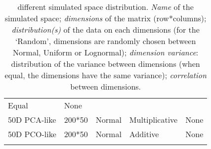 \documentclass[]{article}
\begin{document}
\begin{longtable}[]{@{}lllll@{}}
\begin{minipage}[t]{0.21\columnwidth}
Equal\strut
\end{minipage} & \begin{minipage}[t]{0.13\columnwidth}\raggedright\strut
None\strut
\end{minipage}\tabularnewline
\begin{minipage}[t]{0.12\columnwidth}\raggedright\strut
50D PCA-like\strut
\end{minipage} & \begin{minipage}[t]{0.08\columnwidth}\raggedright\strut
200*50\strut
\end{minipage} & \begin{minipage}[t]{0.31\columnwidth}\raggedright\strut
Normal\strut
\end{minipage} & \begin{minipage}[t]{0.21\columnwidth}\raggedright\strut
Multiplicative\strut
\end{minipage} & \begin{minipage}[t]{0.13\columnwidth}\raggedright\strut
None\strut
\end{minipage}\tabularnewline
\begin{minipage}[t]{0.12\columnwidth}\raggedright\strut
50D PCO-like\strut
\end{minipage} & \begin{minipage}[t]{0.08\columnwidth}\raggedright\strut
200*50\strut
\end{minipage} & \begin{minipage}[t]{0.31\columnwidth}\raggedright\strut
Normal\strut
\end{minipage} & \begin{minipage}[t]{0.21\columnwidth}\raggedright\strut
Additive\strut
\end{minipage} & \begin{minipage}[t]{0.13\columnwidth}\raggedright\strut
None\strut
\end{minipage}\tabularnewline
\bottomrule
\caption{different simulated space distribution. \emph{Name} of the
simulated space; \emph{dimensions} of the matrix (row*columns);
\emph{distribution(s)} of the data on each dimensions (for the `Random',
dimensions are randomly chosen between Normal, Uniform or Lognormal);
\emph{dimension variance}: distribution of the variance between
dimensions (when equal, the dimensions have the same variance);
\emph{correlation} between dimensions.}
\end{longtable}

\renewcommand\baselinestretch{1.6}\selectfont
\end{document}
